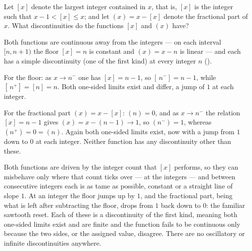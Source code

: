\documentclass[main.tex]{subfiles}
\begin{document}
Let $[x]$ denote the largest integer contained in $x$, that is, $[x]$ is the integer such that $x - 1 < [x] \leq x$; and let $(x) = x - [x]$ denote the fractional part of $x$. What discontinuities do the functions $[x]$ and $(x)$ have?
\begin{SolutionBlue}
Both functions are continuous away from the integers --- on each interval $[n, n+1)$ the floor $[x] = n$ is constant and $(x) = x - n$ is linear --- and each has a simple discontinuity (one of the first kind) at every integer $n$ ().

For the floor: as $x \to n^{-}$ one has $[x] = n - 1$, so $[\,n^{-}] = n - 1$, while $[\,n^{+}] = [n] = n$. Both one-sided limits exist and differ, a jump of $1$ at each integer.

For the fractional part $(x) = x - [x]$: $(n) = 0$, and as $x \to n^{-}$ the relation $[x] = n - 1$ gives $(x) = x - (n-1) \to 1$, so $(n^{-}) = 1$, whereas $(n^{+}) = 0 = (n)$. Again both one-sided limits exist, now with a jump from $1$ down to $0$ at each integer. Neither function has any discontinuity other than these.
\end{SolutionBlue}
\begin{Reflection}
Both functions are driven by the integer count that $[x]$ performs, so they can misbehave only where that count ticks over --- at the integers --- and between consecutive integers each is as tame as possible, constant or a straight line of slope $1$. At an integer the floor jumps up by $1$, and the fractional part, being what is left after subtracting the floor, drops from $1$ back down to $0$: the familiar sawtooth reset. Each of these is a discontinuity of the first kind, meaning both one-sided limits exist and are finite and the function fails to be continuous only because the two sides, or the assigned value, disagree. There are no oscillatory or infinite discontinuities anywhere.
\end{Reflection}
\end{document}
